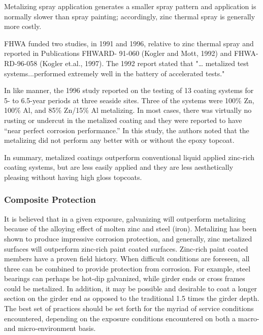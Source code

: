 Metalizing spray application generates a smaller spray pattern and application is normally slower than spray
painting; accordingly, zinc thermal spray is generally more costly.

FHWA funded two studies, in 1991 and 1996, relative to zinc thermal spray and reported in Publications FHWARD-
91-060 (Kogler and Mott, 1992) and FHWA-RD-96-058 (Kogler et.al., 1997). The 1992 report stated that "…
metalized test systems...performed extremely well in the battery of accelerated tests."

In like manner, the 1996 study reported on the testing of 13 coating systems for 5- to 6.5-year periods at three
seaside sites. Three of the systems were 100\% Zn, 100\% Al, and 85\% Zn/15\% Al metalizing. In most cases, there
was virtually no rusting or undercut in the metalized coating and they were reported to have “near perfect corrosion performance.” In this study, the authors noted that the metalizing did not perform any better with or without the
epoxy topcoat.

In summary, metalized coatings outperform conventional liquid applied zinc-rich coating systems, but are less
easily applied and they are less aesthetically pleasing without having high gloss topcoats.

\subsubsection{Composite Protection}
It is believed that in a given exposure, galvanizing will outperform metalizing because of the alloying effect of
molten zinc and steel (iron). Metalizing has been shown to produce impressive corrosion protection, and generally,
zinc metalized surfaces will outperform zinc-rich paint coated surfaces. Zinc-rich paint coated members have a
proven field history. When difficult conditions are foreseen, all three can be combined to provide protection from
corrosion. For example, steel bearings can perhaps be hot-dip galvanized, while girder ends or cross frames could be
metalized. In addition, it may be possible and desirable to coat a longer section on the girder end as opposed to the
traditional 1.5 times the girder depth. The best set of practices should be set forth for the myriad of service conditions
encountered, depending on the exposure conditions encountered on both a macro- and micro-environment basis.


